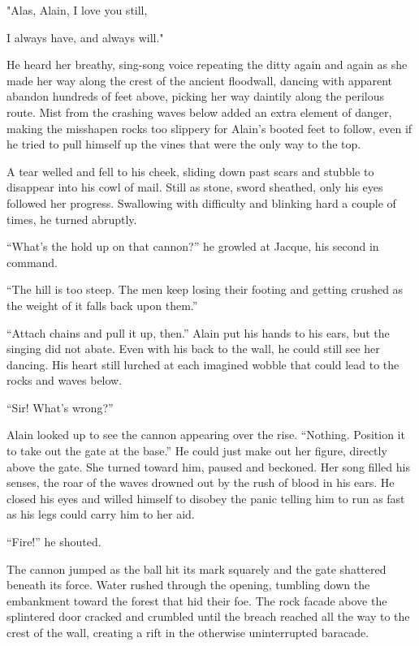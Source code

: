 
"Alas, Alain, I love you still,

I always have, and always will."

He heard her breathy, sing-song voice repeating the ditty again and
again as she made her way along the crest of the ancient floodwall,
dancing with apparent abandon hundreds of feet above, picking her way
daintily along the perilous route. Mist from the crashing waves below
added an extra element of danger, making the misshapen rocks too
slippery for Alain's booted feet to follow, even if he tried to pull
himself up the vines that were the only way to the top.

A tear welled and fell to his cheek, sliding down past scars and stubble
to disappear into his cowl of mail. Still as stone, sword sheathed, only
his eyes followed her progress. Swallowing with difficulty and blinking
hard a couple of times, he turned abruptly.

``What's the hold up on that cannon?'' he growled at Jacque, his second
in command.

``The hill is too steep. The men keep losing their footing and getting
crushed as the weight of it falls back upon them.''

``Attach chains and pull it up, then.'' Alain put his hands to his ears,
but the singing did not abate. Even with his back to the wall, he could
still see her dancing. His heart still lurched at each imagined wobble
that could lead to the rocks and waves below.

``Sir! What's wrong?''

Alain looked up to see the cannon appearing over the rise. ``Nothing.
Position it to take out the gate at the base.'' He could just make out
her figure, directly above the gate. She turned toward him, paused and
beckoned. Her song filled his senses, the roar of the waves drowned out
by the rush of blood in his ears. He closed his eyes and willed himself
to disobey the panic telling him to run as fast as his legs could carry
him to her aid.

``Fire!'' he shouted.

The cannon jumped as the ball hit its mark squarely and the gate
shattered beneath its force. Water rushed through the opening, tumbling
down the embankment toward the forest that hid their foe. The rock
facade above the splintered door cracked and crumbled until the breach
reached all the way to the crest of the wall, creating a rift in the
otherwise uninterrupted baracade.

